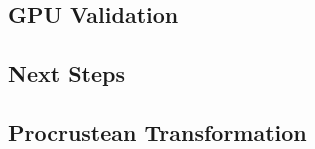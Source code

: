     \subsection{GPU Validation}
    

    \subsection{Next Steps}
    
        
    \subsection{Procrustean Transformation}
    











    


